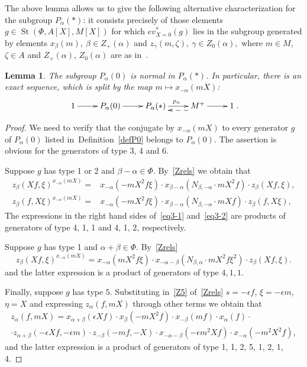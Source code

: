 \documentclass[oneside, 8pt]{amsart}
\newtheorem{lemma}{Lemma}
\theoremstyle{remark}
\theoremstyle{definition}
\DeclareMathOperator{\St}{St}
\numberwithin{equation}{section}
\begin{document}
The above lemma allows us to give the following alternative characterization for the subgroup $P_\alpha(*)$:
 it consists precisely of those elements $g \in \St(\Phi, A[X], M[X])$ for which $ev_{X=0}^*(g)$ lies in the subgroup generated by
 elements $x_{\beta}(m),\ \beta \in Z_+(\alpha)$ and $z_{\gamma}(m, \zeta),\ \gamma \in Z_0(\alpha),$ where $m \in M$, $\zeta \in A$ 
 and $Z_+(\alpha)$, $Z_0(\alpha)$ are as in~\cite[Proposition~5.7]{St71}.
   
\begin{lemma}\label{P0_normal} The subgroup $P_\alpha(0)$ is normal in $P_\alpha(*)$. In particular, there is an exact sequence, which is split by the map $m \mapsto x_{-\alpha}(mX)$:
\[\xymatrix{1 \ar[r] & P_\alpha(0) \ar[r] & P_\alpha(*) \ar[r]^{p_\alpha} & M^+ \ar@<5pt>@{-->}[l] \ar[r] & 1}.\] \end{lemma}
\begin{proof} 
We need to verify that the conjugate by $x_{-\alpha}(mX)$ to every generator $g$ of $P_\alpha(0)$ listed in~Definition~\ref{defP0} belongs to $P_\alpha(0)$.
The assertion is obvious for the generators of type 3, 4 and 6.

Suppose $g$ has type 1 or 2 and $\beta - \alpha \in \Phi$. By~\cref{Zrels} we obtain that
\begin{align} z_{\beta}(Xf, \xi) ^ {x_{-\alpha}(mX)} = & x_{-\alpha} (- mX^2f\xi) \cdot x_{\beta-\alpha} (N_{\beta, -\alpha}\cdot mX^2f) \cdot z_{\beta}(Xf, \xi), \label{eq3-1} \\
  z_{\beta}(f, X\xi) ^ {x_{-\alpha}(mX)} = & x_{-\alpha} (- mX^2f\xi ) \cdot x_{\beta-\alpha} (N_{\beta, -\alpha}\cdot mXf) \cdot z_{\beta}(f, X\xi), \nonumber \end{align}
The expressions in the right hand sides of~\eqref{eq3-1} and~\eqref{eq3-2} are products of generators of type 4, 1, 1 and 4, 1, 2, respectively.  

Suppose $g$ has type 1 and  $\alpha + \beta \in \Phi$. By~\cref{Zrels} 
\begin{equation} \label{eq3-2} z_{\beta}(Xf, \xi) ^ {x_{-\alpha}(mX)} = x_{-\alpha} (mX^2f\xi ) \cdot x_{-\alpha-\beta} (N_{\beta,\alpha}\cdot mX^2f\xi^2) \cdot z_{\beta}(Xf, \xi). \end{equation}
and the latter expression is a product of generators of type $4, 1, 1$.

Finally, suppose $g$ has type $5$.
Substituting in~\eqref{Z5} of~\cref{Zrels} $s = -\epsilon f$, $\xi = -\epsilon m$, $\eta=X$ and expressing $z_\alpha(f, mX)$ through other terms we obtain that
\begin{multline} \label{eq:zalpha} z_\alpha(f, mX) = x_{\alpha+\beta}(\epsilon Xf) \cdot x_{\beta}(-mX^2 f) \cdot x_{-\beta}(mf) \cdot x_\alpha(f) \cdot \\ 
 \cdot z_{\alpha+\beta}(-\epsilon X f, -\epsilon m) \cdot z_{-\beta}(-mf, -X) \cdot x_{-\alpha-\beta}(-\epsilon m^2X f) \cdot x_{-\alpha}(-m^2X^2 f), \end{multline}
and the latter expression is a product of generators of type 1, 1, 2, 5, 1, 2, 1, 4.
\end{proof}
\end{document}
